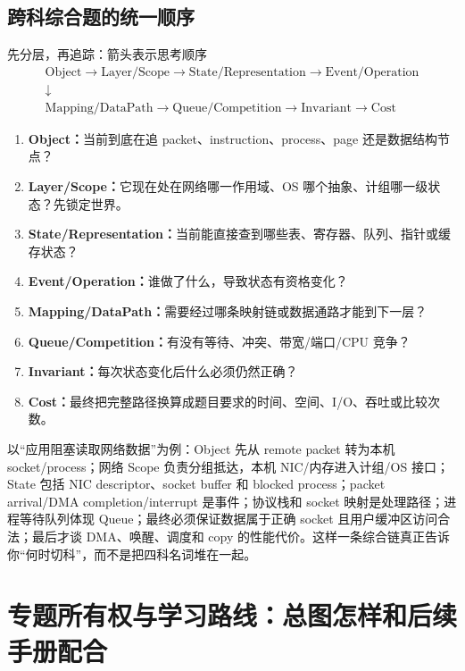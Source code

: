 \documentclass[11pt,a4paper,openany]{ctexbook}
\newcommand{\key}[1]{\textbf{\color{deep}#1}}
\begin{document}
\section{跨科综合题的统一顺序}
\begin{examBox}{先分层，再追踪：箭头表示思考顺序}
\[
\boxed{\begin{gathered}\text{Object}\rightarrow\text{Layer/Scope}\rightarrow\text{State/Representation}\rightarrow\text{Event/Operation}\\\downarrow\\\text{Mapping/DataPath}\rightarrow\text{Queue/Competition}\rightarrow\text{Invariant}\rightarrow\text{Cost}\end{gathered}}
\]
\begin{enumerate}
  \item \key{Object：}当前到底在追 packet、instruction、process、page 还是数据结构节点？
  \item \key{Layer/Scope：}它现在处在网络哪一作用域、OS 哪个抽象、计组哪一级状态？先锁定世界。
  \item \key{State/Representation：}当前能直接查到哪些表、寄存器、队列、指针或缓存状态？
  \item \key{Event/Operation：}谁做了什么，导致状态有资格变化？
  \item \key{Mapping/DataPath：}需要经过哪条映射链或数据通路才能到下一层？
  \item \key{Queue/Competition：}有没有等待、冲突、带宽/端口/CPU 竞争？
  \item \key{Invariant：}每次状态变化后什么必须仍然正确？
  \item \key{Cost：}最终把完整路径换算成题目要求的时间、空间、I/O、吞吐或比较次数。
\end{enumerate}
\end{examBox}

以“应用阻塞读取网络数据”为例：Object 先从 remote packet 转为本机 socket/process；网络 Scope 负责分组抵达，本机 NIC/内存进入计组/OS 接口；State 包括 NIC descriptor、socket buffer 和 blocked process；packet arrival/DMA completion/interrupt 是事件；协议栈和 socket 映射是处理路径；进程等待队列体现 Queue；最终必须保证数据属于正确 socket 且用户缓冲区访问合法；最后才谈 DMA、唤醒、调度和 copy 的性能代价。这样一条综合链真正告诉你“何时切科”，而不是把四科名词堆在一起。

\chapter{专题所有权与学习路线：总图怎样和后续手册配合}
\end{document}
